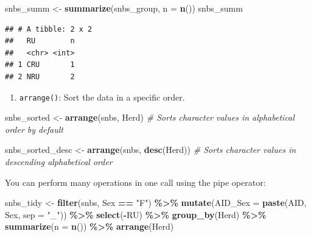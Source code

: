 \documentclass[
]{book}
\newenvironment{Shaded}{\begin{snugshade}}{\end{snugshade}}
\newcommand{\AttributeTok}[1]{\textcolor[rgb]{0.13,0.29,0.53}{#1}}
\newcommand{\CommentTok}[1]{\textcolor[rgb]{0.56,0.35,0.01}{\textit{#1}}}
\newcommand{\FunctionTok}[1]{\textcolor[rgb]{0.13,0.29,0.53}{\textbf{#1}}}
\newcommand{\NormalTok}[1]{#1}
\newcommand{\OtherTok}[1]{\textcolor[rgb]{0.56,0.35,0.01}{#1}}
\newcommand{\SpecialCharTok}[1]{\textcolor[rgb]{0.81,0.36,0.00}{\textbf{#1}}}
\newcommand{\StringTok}[1]{\textcolor[rgb]{0.31,0.60,0.02}{#1}}
\providecommand{\tightlist}{%
  \setlength{\itemsep}{0pt}\setlength{\parskip}{0pt}}
\begin{document}
\begin{Shaded}
\begin{Highlighting}[]
\NormalTok{snbs\_summ }\OtherTok{\textless{}{-}} \FunctionTok{summarize}\NormalTok{(snbs\_group, }\AttributeTok{n =} \FunctionTok{n}\NormalTok{())}
\NormalTok{snbs\_summ}
\end{Highlighting}
\end{Shaded}

\begin{verbatim}
## # A tibble: 2 x 2
##   RU        n
##   <chr> <int>
## 1 CRU       1
## 2 NRU       2
\end{verbatim}

\begin{enumerate}
\def\labelenumi{\arabic{enumi}.}
\setcounter{enumi}{5}
\tightlist
\item
  \texttt{arrange()}: Sort the data in a specific order.
\end{enumerate}

\begin{Shaded}
\begin{Highlighting}[]
\NormalTok{snbs\_sorted }\OtherTok{\textless{}{-}} \FunctionTok{arrange}\NormalTok{(snbs, Herd)}
\CommentTok{\# Sorts character values in alphabetical order by default}

\NormalTok{snbs\_sorted\_desc }\OtherTok{\textless{}{-}} \FunctionTok{arrange}\NormalTok{(snbs, }\FunctionTok{desc}\NormalTok{(Herd))}
\CommentTok{\# Sorts character values in descending alphabetical order}
\end{Highlighting}
\end{Shaded}

You can perform many operations in one call using the pipe operator:

\begin{Shaded}
\begin{Highlighting}[]
\NormalTok{snbs\_tidy }\OtherTok{\textless{}{-}} \FunctionTok{filter}\NormalTok{(snbs, Sex }\SpecialCharTok{==} \StringTok{"F"}\NormalTok{) }\SpecialCharTok{\%\textgreater{}\%}
  \FunctionTok{mutate}\NormalTok{(}\AttributeTok{AID\_Sex =} \FunctionTok{paste}\NormalTok{(AID, Sex, }\AttributeTok{sep =} \StringTok{"\_"}\NormalTok{)) }\SpecialCharTok{\%\textgreater{}\%}
  \FunctionTok{select}\NormalTok{(}\SpecialCharTok{{-}}\NormalTok{RU) }\SpecialCharTok{\%\textgreater{}\%}
  \FunctionTok{group\_by}\NormalTok{(Herd) }\SpecialCharTok{\%\textgreater{}\%}
  \FunctionTok{summarize}\NormalTok{(}\AttributeTok{n =} \FunctionTok{n}\NormalTok{()) }\SpecialCharTok{\%\textgreater{}\%}
  \FunctionTok{arrange}\NormalTok{(Herd)}
\end{Highlighting}
\end{Shaded}
\end{document}

